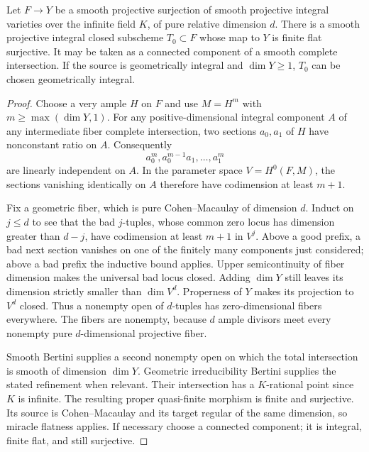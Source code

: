 \begin{lemma}
\label{r11p:multisection}
Let $F\to Y$ be a smooth projective surjection of smooth projective
integral varieties over the infinite field $K$, of pure relative
dimension $d$.  There is a smooth projective integral closed subscheme
$T_0\subset F$ whose map to $Y$ is finite flat surjective.
It may be taken as a connected component of a smooth complete intersection.
If the source is geometrically integral and $\dim Y\geq1$, $T_0$
can be chosen geometrically integral.
\end{lemma}

\begin{proof}
Choose a very ample $H$ on $F$ and use $M=H^m$ with
$m\geq\max(\dim Y,1)$.  For any positive-dimensional integral component
$A$ of any intermediate fiber complete intersection, two sections
$a_0,a_1$ of $H$ have nonconstant ratio on $A$.  Consequently
\[
                    a_0^m,a_0^{m-1}a_1,\ldots,a_1^m
\]
are linearly independent on $A$.  In the parameter space
$V=H^0(F,M)$, the sections vanishing identically on $A$ therefore
have codimension at least $m+1$.

Fix a geometric fiber, which is pure Cohen--Macaulay of dimension $d$.
Induct on $j\leq d$ to see that the bad $j$-tuples, whose common
zero locus has dimension greater than $d-j$, have codimension at least
$m+1$ in $V^j$.  Above a good prefix, a bad next section vanishes
on one of the finitely many components just considered; above a bad
prefix the inductive bound applies.  Upper semicontinuity of fiber
dimension makes the universal bad locus closed.  Adding $\dim Y$
still leaves its dimension strictly smaller than $\dim V^d$.
Properness of $Y$ makes its projection to $V^d$ closed.  Thus a
nonempty open of $d$-tuples has zero-dimensional fibers everywhere.
The fibers are nonempty, because $d$ ample divisors meet every
nonempty pure $d$-dimensional projective fiber.

Smooth Bertini supplies a second nonempty open on which the total
intersection is smooth of dimension $\dim Y$.  Geometric irreducibility
Bertini supplies the stated refinement when relevant.  Their intersection
has a $K$-rational point since $K$ is infinite.  The resulting proper
quasi-finite morphism is finite and surjective.  Its source is
Cohen--Macaulay and its target regular of the same dimension, so
miracle flatness applies.  If necessary choose a connected component;
it is integral, finite flat, and still surjective.
\end{proof}

